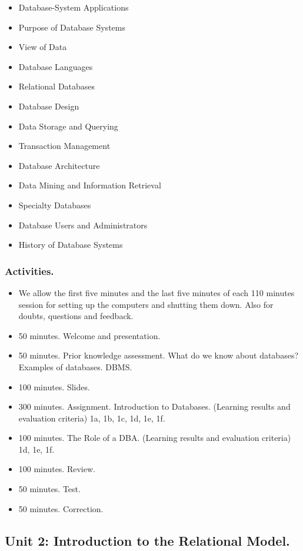 \documentclass[catalan, a4paper, 12pt, titlepage]{article}
\begin{document}
  \begin{itemize}
	  \item Database-System Applications
	  \item Purpose of Database Systems
	  \item View of Data
	  \item Database Languages
	  \item Relational Databases
	  \item Database Design
	  \item Data Storage and Querying
	  \item Transaction Management
	  \item Database Architecture
	  \item Data Mining and Information Retrieval
	  \item Specialty Databases
	  \item Database Users and Administrators
	  \item History of Database Systems
  \end{itemize}
  
  \subsubsection{Activities.}

  \begin{itemize}
          \item We allow the first five minutes and the last five minutes of each 110 minutes session for setting up the computers and shutting them down. Also for doubts, questions and feedback.
	  \item 50 minutes. Welcome and presentation.
	  \item 50 minutes. Prior knowledge assessment. What do we know about databases? Examples of databases. DBMS.
	  \item 100 minutes. Slides.
	  \item 300 minutes. Assignment. Introduction to Databases.
		  (\faGraduationCap Learning results and evaluation criteria) 1a, 1b, 1c, 1d, 1e, 1f.
	  \item 100 minutes. The Role of a DBA.
		  (\faGraduationCap Learning results and evaluation criteria) 1d, 1e, 1f.
	  \item 100 minutes. Review.
	  \item 50 minutes. Test.
	  \item 50 minutes. Correction.
  \end{itemize}

  \subsection{Unit 2: Introduction to the Relational Model.}
\end{document}
